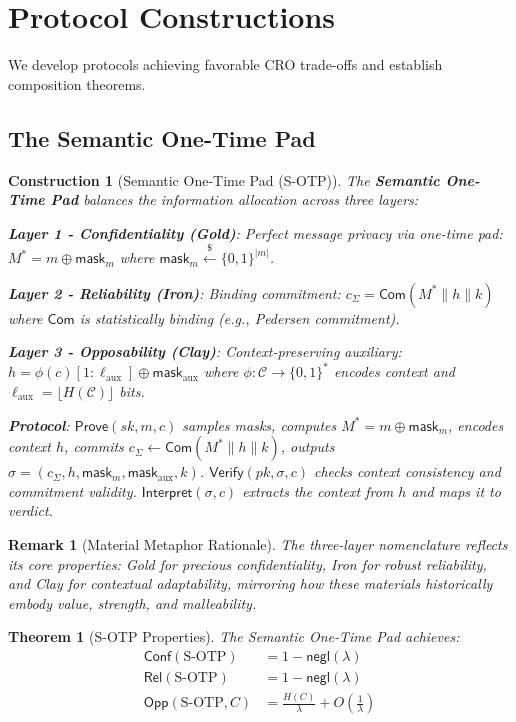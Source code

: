 \documentclass{ieeeaccess}
\newtheorem{theorem}{Theorem}[subsection]
\newtheorem{remark}{Remark}[subsection]
\newtheorem{construction}{Construction}[subsection]
\begin{document}
\section{Protocol Constructions}\label{sec:constructions}

We develop protocols achieving favorable CRO trade-offs and establish composition theorems.

\subsection{The Semantic One-Time Pad}

\begin{construction}[Semantic One-Time Pad (S-OTP)]\label{constr:sotp}
The \textbf{Semantic One-Time Pad} balances the information allocation across three layers:

\textbf{Layer 1 - Confidentiality (Gold)}: Perfect message privacy via one-time pad: $M^* = m \oplus \mathsf{mask}_m$ where $\mathsf{mask}_m \xleftarrow{\$} \{0,1\}^{|m|}$.

\textbf{Layer 2 - Reliability (Iron)}: Binding commitment: $c_\Sigma = \mathsf{Com}(M^* \| h \| k)$ where $\mathsf{Com}$ is statistically binding (e.g., Pedersen commitment).

\textbf{Layer 3 - Opposability (Clay)}: Context-preserving auxiliary: $h = \phi(c)[1:\ell_{\text{aux}}] \oplus \mathsf{mask}_{\text{aux}}$ where $\phi: \mathcal{C} \to \{0,1\}^*$ encodes context and $\ell_{\text{aux}} = \lfloor H(\mathcal{C}) \rfloor$ bits.

\textbf{Protocol}: $\mathsf{Prove}(sk, m, c)$ samples masks, computes $M^* = m \oplus \mathsf{mask}_m$, encodes context $h$, commits $c_\Sigma \gets \mathsf{Com}(M^* \| h \| k)$, outputs $\sigma = (c_\Sigma, h, \mathsf{mask}_m, \mathsf{mask}_{\text{aux}}, k)$. $\mathsf{Verify}(pk, \sigma, c)$ checks context consistency and commitment validity. $\mathsf{Interpret}(\sigma, c)$ extracts the context from $h$ and maps it to verdict.
\end{construction}

\begin{remark}[Material Metaphor Rationale]
The three-layer nomenclature reflects its core properties: \emph{Gold} for precious confidentiality, \emph{Iron} for robust reliability, and \emph{Clay} for contextual adaptability, mirroring how these materials historically embody value, strength, and malleability.
\end{remark}

\begin{theorem}[S-OTP Properties]\label{thm:sotp_properties}
The Semantic One-Time Pad achieves:
\begin{align}
\mathsf{Conf}(\text{S-OTP}) &= 1 - \mathsf{negl}(\lambda) \\
\mathsf{Rel}(\text{S-OTP}) &= 1 - \mathsf{negl}(\lambda) \\
\mathsf{Opp}(\text{S-OTP}, C) &= \frac{H(C)}{\lambda} + O\left(\frac{1}{\lambda}\right)
\end{align}
\end{theorem}
\end{document}
